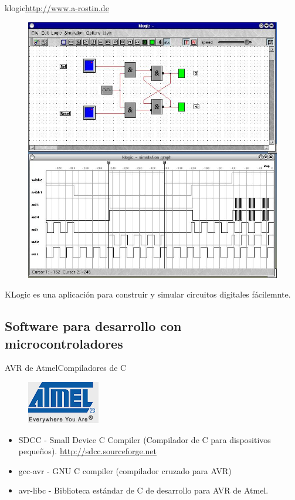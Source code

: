 \documentclass{beamer}
\begin{document}
\begin{frame}{klogic}{\url{http://www.a-rostin.de}}
  \begin{figure}[!h]
    \centering
    \includegraphics[scale=0.18]{img/klogic.jpg}
  \end{figure}
  KLogic es una aplicación para construir y simular circuitos digitales fácilemnte.
\end{frame}

\subsection[Microcontroladores]{Software para desarrollo con microcontroladores}

\begin{frame}{AVR de Atmel}{Compiladores de C}
  \begin{figure}[!h]
    \centering
    \includegraphics[scale=2]{img/atmel_logo.jpg}
  \end{figure}
  \begin{itemize}
  \item SDCC - Small Device C Compiler (Compilador de C para dispositivos pequeños). \url{http://sdcc.sourceforge.net}
  \item gcc-avr - GNU C compiler (compilador cruzado para AVR)
  \item avr-libc - Biblioteca estándar de C de desarrollo para AVR de Atmel.
  \end{itemize}
\end{frame}
\end{document}

